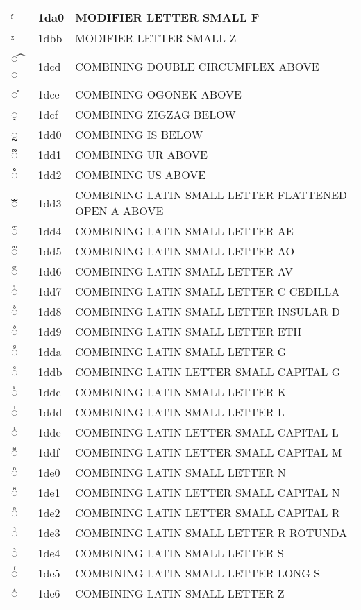 \documentclass[12pt,letterpaper,openany]{book}
\begin{document}
\begin{center}
\begin{supertabular}{|m{0.25in}|m{0.5in}|m{4in}|}
			ᶠ & 1da0 & MODIFIER LETTER SMALL F\\\hline
			ᶻ & 1dbb & MODIFIER LETTER SMALL Z\\\hline
			◌ ᷍ ◌ & 1dcd & COMBINING DOUBLE CIRCUMFLEX ABOVE\\\hline
			◌ ᷎ & 1dce & COMBINING OGONEK ABOVE\\\hline
			◌᷏ & 1dcf & COMBINING ZIGZAG BELOW\\\hline
			◌᷐ & 1dd0 & COMBINING IS BELOW\\\hline
			◌᷑ & 1dd1 & COMBINING UR ABOVE\\\hline
			◌᷒ & 1dd2 & COMBINING US ABOVE\\\hline
			◌ᷓ & 1dd3 & COMBINING LATIN SMALL LETTER FLATTENED OPEN A ABOVE\\\hline
			◌ᷔ & 1dd4 & COMBINING LATIN SMALL LETTER AE\\\hline
			◌ᷕ & 1dd5 & COMBINING LATIN SMALL LETTER AO\\\hline
			◌ᷖ & 1dd6 & COMBINING LATIN SMALL LETTER AV\\\hline
			◌ᷗ & 1dd7 & COMBINING LATIN SMALL LETTER C CEDILLA\\\hline
			◌ᷘ & 1dd8 & COMBINING LATIN SMALL LETTER INSULAR D\\\hline
			◌ᷙ & 1dd9 & COMBINING LATIN SMALL LETTER ETH\\\hline
			◌ᷚ & 1dda & COMBINING LATIN SMALL LETTER G\\\hline
			◌ᷛ & 1ddb & COMBINING LATIN LETTER SMALL CAPITAL G\\\hline
			◌ᷜ & 1ddc & COMBINING LATIN SMALL LETTER K\\\hline
			◌ᷝ & 1ddd & COMBINING LATIN SMALL LETTER L\\\hline
			◌ᷞ & 1dde & COMBINING LATIN LETTER SMALL CAPITAL L\\\hline
			◌ᷟ & 1ddf & COMBINING LATIN LETTER SMALL CAPITAL M\\\hline
			◌ᷠ & 1de0 & COMBINING LATIN SMALL LETTER N\\\hline
			◌ᷡ & 1de1 & COMBINING LATIN LETTER SMALL CAPITAL N\\\hline
			◌ᷢ & 1de2 & COMBINING LATIN LETTER SMALL CAPITAL R\\\hline
			◌ᷣ & 1de3 & COMBINING LATIN SMALL LETTER R ROTUNDA\\\hline
			◌ᷤ & 1de4 & COMBINING LATIN SMALL LETTER S\\\hline
			◌ᷥ & 1de5 & COMBINING LATIN SMALL LETTER LONG S\\\hline
			◌ᷦ & 1de6 & COMBINING LATIN SMALL LETTER Z\\\hline

\end{supertabular}
\end{center}
\end{document}
